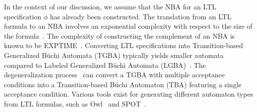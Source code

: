 In the context of our discussion, we assume that the NBA for an LTL specification $\phi$ has already been constructed. The translation from an LTL formula to an NBA involves an exponential complexity with respect to the size of the formula~\cite{vardi2005automata}. The complexity of constructing the complement of an NBA is known to be EXPTIME~\cite{complementnba}. Converting LTL specifications into Transition-based Generalized Büchi Automata (TGBA) typically yields smaller automata compared to Labeled Generalized Büchi Automata (LGBA)~\cite{couvreur1999fly}. The degeneralization process~\cite{giannakopoulou2002states} can convert a TGBA with multiple acceptance conditions into a Transition-based Büchi Automaton (TBA) featuring a single acceptance condition. Various tools exist for generating different automaton types from LTL formulas, such as Owl~\cite{owl} and SPOT~\cite{spot}.
